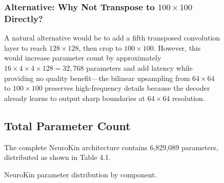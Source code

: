 \documentclass[12pt,a4paper,oneside]{report}
\begin{document}
\begin{figure}[H]
\subsubsection{Alternative: Why Not Transpose to $100 \times 100$ Directly?}

A natural alternative would be to add a fifth transposed convolution layer to reach $128 \times 128$, then crop to $100 \times 100$. However, this would increase parameter count by approximately $16 \times 4 \times 4 \times 128 = 32,768$ parameters and add latency while providing no quality benefit---the bilinear upsampling from $64 \times 64$ to $100 \times 100$ preserves high-frequency details because the decoder already learns to output sharp boundaries at $64 \times 64$ resolution.

\subsection{Total Parameter Count}

The complete NeuroKin architecture contains 6,829,089 parameters, distributed as shown in Table 4.1.

\begin{table}[H]
\centering
\caption{NeuroKin parameter distribution by component.}
\label{tab:neurokin_params_ch4}
\end{table}


\end{figure}
\end{document}
